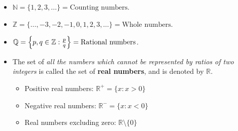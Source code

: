 \documentclass[12pt,a4paper,titlepage]{article}
\DeclarePairedDelimiter {\curls} { \{      }     { \}      }
\begin{document}
            \begin{SummaryBox}[title=Sets of numbers, center lower]
                \begin{itemize}[leftmargin=*]
                    \item $\mathbb{N}=\{1,2,3,\dots\}=\text{Counting numbers}$.
                    \item $\mathbb{Z}=\{\dots,-3,-2,-1,0,1,2,3,\dots\}=\text{Whole numbers}$.
                    \item $\mathbb{Q}=\curls*{p,q \in \mathbb{Z}:\frac{p}{q}}=\text{Rational numbers}$.
                    \item The set of \textit{all the numbers which cannot be represented by ratios of two integers} is called the set of \textbf{real numbers}, and is denoted by $\mathbb{R}$.
                    \begin{itemize}[topsep=0pt]
                        \item Positive real numbers: $\mathbb{R}^+ = \{x:x>0\}$
                        \item Negative real numbers: $\mathbb{R}^- = \{x:x<0\}$
                        \item Real numbers excluding zero: $\mathbb{R}\setminus\{0\}$
                    \end{itemize}
                \end{itemize}
                \tcblower
            \end{SummaryBox}
            
\end{document}
